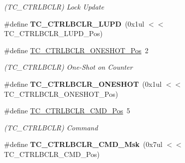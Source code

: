 \begin{DoxyCompactItemize}
\begin{DoxyCompactList}\small\item\em (T\+C\+\_\+\+C\+T\+R\+L\+B\+C\+L\+R) Lock Update \end{DoxyCompactList}\item 
\hypertarget{group___s_a_m_l21___t_c_gaee99622b71cc24b06df2e57d4da076e5}{}\#define {\bfseries T\+C\+\_\+\+C\+T\+R\+L\+B\+C\+L\+R\+\_\+\+L\+U\+P\+D}~(0x1ul $<$$<$ T\+C\+\_\+\+C\+T\+R\+L\+B\+C\+L\+R\+\_\+\+L\+U\+P\+D\+\_\+\+Pos)\label{group___s_a_m_l21___t_c_gaee99622b71cc24b06df2e57d4da076e5}

\item 
\hypertarget{group___s_a_m_l21___t_c_gaf86e6c22344aa634ed5b8987b3948f24}{}\#define \hyperlink{group___s_a_m_l21___t_c_gaf86e6c22344aa634ed5b8987b3948f24}{T\+C\+\_\+\+C\+T\+R\+L\+B\+C\+L\+R\+\_\+\+O\+N\+E\+S\+H\+O\+T\+\_\+\+Pos}~2\label{group___s_a_m_l21___t_c_gaf86e6c22344aa634ed5b8987b3948f24}

\begin{DoxyCompactList}\small\item\em (T\+C\+\_\+\+C\+T\+R\+L\+B\+C\+L\+R) One-\/\+Shot on Counter \end{DoxyCompactList}\item 
\hypertarget{group___s_a_m_l21___t_c_gadcc34814eed96f1d3756894d53bcfa84}{}\#define {\bfseries T\+C\+\_\+\+C\+T\+R\+L\+B\+C\+L\+R\+\_\+\+O\+N\+E\+S\+H\+O\+T}~(0x1ul $<$$<$ T\+C\+\_\+\+C\+T\+R\+L\+B\+C\+L\+R\+\_\+\+O\+N\+E\+S\+H\+O\+T\+\_\+\+Pos)\label{group___s_a_m_l21___t_c_gadcc34814eed96f1d3756894d53bcfa84}

\item 
\hypertarget{group___s_a_m_l21___t_c_gab48aaea729baf61fabeb52131fb7aac2}{}\#define \hyperlink{group___s_a_m_l21___t_c_gab48aaea729baf61fabeb52131fb7aac2}{T\+C\+\_\+\+C\+T\+R\+L\+B\+C\+L\+R\+\_\+\+C\+M\+D\+\_\+\+Pos}~5\label{group___s_a_m_l21___t_c_gab48aaea729baf61fabeb52131fb7aac2}

\begin{DoxyCompactList}\small\item\em (T\+C\+\_\+\+C\+T\+R\+L\+B\+C\+L\+R) Command \end{DoxyCompactList}\item 
\hypertarget{group___s_a_m_l21___t_c_ga83a38a9f59c450732e0546c3d4cd228d}{}\#define {\bfseries T\+C\+\_\+\+C\+T\+R\+L\+B\+C\+L\+R\+\_\+\+C\+M\+D\+\_\+\+Msk}~(0x7ul $<$$<$ T\+C\+\_\+\+C\+T\+R\+L\+B\+C\+L\+R\+\_\+\+C\+M\+D\+\_\+\+Pos)\label{group___s_a_m_l21___t_c_ga83a38a9f59c450732e0546c3d4cd228d}


\end{DoxyCompactItemize}
